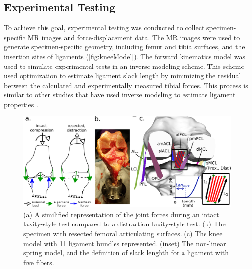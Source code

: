 \subsection*{Experimental Testing}
To achieve this goal, experimental testing was conducted to collect specimen-specific MR images and force-displacement data. The MR images were used to generate specimen-specific geometry, including femur and tibia surfaces, and the insertion sites of ligaments (\autoref{fig:kneeModel}). The forward kinematics model was used to simulate experimental tests in an inverse modeling scheme. This scheme used optimization to estimate ligament slack length by minimizing the residual between the calculated and experimentally measured tibial forces. This process is similar to other studies that have used inverse modeling to estimate ligament properties \citep{blankevoort_validation_1996,baldwin_dynamic_2012,ewing_estimating_2015,harris_combined_2016}.

\begin{figure}
    \centering
    \includegraphics[width=0.85\linewidth]{../img/TwoColumnFig.png}
    \caption{(a) A similified representation of the joint forces during an intact laxity-style test compared to a distraction laxity-style test. (b) The specimen with resected femoral articulating surfaces. (c) The knee model with 11 ligament bundles represented. (inset) The non-linear spring model, and the definition of slack lenghth for a ligament with five fibers.}
    \label{fig:kneeModel}
\end{figure}

